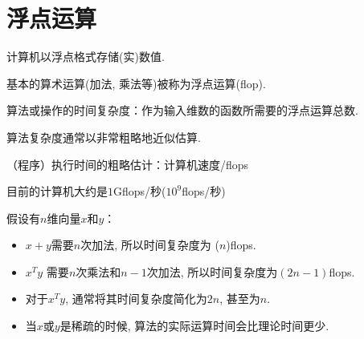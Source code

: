 \section{浮点运算}

计算机以浮点格式存储(实)数值. 

基本的算术运算(加法, 乘法等)被称为浮点运算(flop). 

算法或操作的时间复杂度：作为输入维数的函数所需要的浮点运算总数. 

算法复杂度通常以非常粗略地近似估算. 

（程序）执行时间的粗略估计：计算机速度/flops

目前的计算机大约是$1$Gflops/秒($10^9$flops/秒)

\begin{corollary}
    假设有$n$维向量$x$和$y$：

    \begin{itemize}
        \item $x+y$需要$n$次加法, 所以时间复杂度为 ($n$)flops. 
        \item $x^T y$ 需要$n$次乘法和$n - 1$次加法, 所以时间复杂度为$(2n - 1)$flops. 
        \item 对于$x^T y$, 通常将其时间复杂度简化为$2n$, 甚至为$n$. 
        \item 当$x$或$y$是稀疏的时候, 算法的实际运算时间会比理论时间更少. 
    \end{itemize}
\end{corollary}




